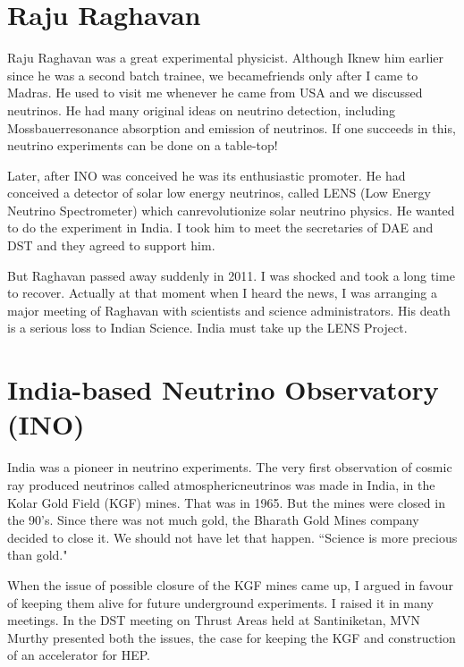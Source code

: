 \vspace{-\topsep}
\section*{Raju Raghavan}

Raju Raghavan was a great experimental physicist. Although I\break knew him 
earlier since he was a second batch trainee, we became\break friends only 
after I came to Madras. He used to visit me whenever he came from USA 
and we discussed neutrinos. He had many origi\-nal ideas on neutrino 
detection, including Mossbauer\break resonance absorption and emission of 
neutrinos. If one succeeds in this, neutrino experiments can be done on 
a table-top!
 
Later, after INO was conceived he was its enthusiastic promo\-ter. He had 
conceived a detector of solar low energy neutrinos, called LENS (Low 
Energy Neutrino Spectrometer) which can\break revolutionize solar neutrino 
physics. He wanted to do the experi\-ment in India. I took him to meet the 
secretaries of DAE and DST and they agreed to support him.

But Raghavan passed away suddenly in 2011. I was shocked and took a long 
time to recover. Actually at that moment when I heard the news, I was 
arranging a major meeting of Raghavan with scientists and science 
administrators. His death is a serious loss to Indian Science. India 
must take up the LENS Project.
\newpage

\section*{India-based Neutrino Observatory (INO)}

India was a pioneer in neutrino experiments. The very first obser\-vation 
of cosmic ray produced neutrinos called atmospheric\break neutrinos was made 
in India, in the Kolar Gold Field (KGF) mines. That was in 1965. But the 
mines were closed in the 90's. Since there was not much gold, the 
Bharath Gold Mines company decided to close it. We should not have let 
that happen. ``Science is more precious than gold."
\medskip

When the issue of possible closure of the KGF mines came up, I argued in 
favour of keeping them alive for future underground experiments. I 
raised it in many meetings. In the DST meeting on Thrust Areas held at 
Santiniketan, MVN Murthy presented both the issues, the case for keeping 
the KGF and construction of an accelerator for HEP.
\medskip

